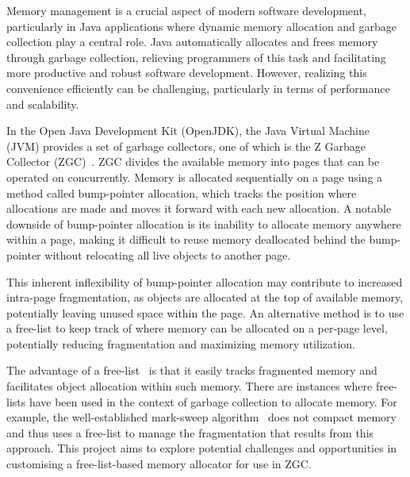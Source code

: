 
Memory management is a crucial aspect of modern software development, particularly in Java applications where dynamic memory allocation and garbage collection play a central role. Java automatically allocates and frees memory through garbage collection, relieving programmers of this task and facilitating more productive and robust software development. However, realizing this convenience efficiently can be challenging, particularly in terms of performance and scalability.

In the Open Java Development Kit (OpenJDK), the Java Virtual Machine (JVM) provides a set of garbage collectors, one of which is the Z Garbage Collector (ZGC)~\cite{zgc}. ZGC divides the available memory into pages that can be operated on concurrently. Memory is allocated sequentially on a page using a method called bump-pointer allocation, which tracks the position where allocations are made and moves it forward with each new allocation. A notable downside of bump-pointer allocation is its inability to allocate memory anywhere within a page, making it difficult to reuse memory deallocated behind the bump-pointer without relocating all live objects to another page.

This inherent inflexibility of bump-pointer allocation may contribute to increased intra-page fragmentation, as objects are allocated at the top of available memory, potentially leaving unused space within the page. An alternative method is to use a free-list to keep track of where memory can be allocated on a per-page level, potentially reducing fragmentation and maximizing memory utilization.

The advantage of a free-list~\cite{gchandbook} is that it easily tracks fragmented memory and facilitates object allocation within such memory. There are instances where free-lists have been used in the context of garbage collection to allocate memory. For example, the well-established mark-sweep algorithm~\cite{gchandbook} does not compact memory and thus uses a free-list to manage the fragmentation that results from this approach. This project aims to explore potential challenges and opportunities in customising a free-list-based memory allocator for use in ZGC.

